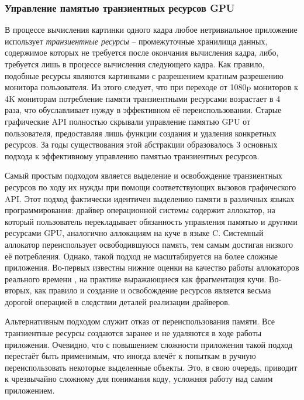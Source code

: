 \subsubsection{Управление памятью транзиентных ресурсов GPU}
В процессе вычисления картинки одного кадра любое нетривиальное приложение использует \textit{транзиентные ресурсы} -- промежуточные хранилища данных, содержимое которых не требуется после окончания вычисления кадра, либо, требуется лишь в процессе вычисления следующего кадра.
Как правило, подобные ресурсы являются картинками с разрешением кратным разрешению монитора пользователя.
Из этого следует, что при переходе от 1080p мониторов к 4K мониторам потребление памяти транзиентными ресурсами возрастает в 4 раза, что обуславливает нужду в эффективном её переиспользовании.
Старые графические API полностью скрывали управление памятью GPU от пользователя, предоставляя лишь функции создания и удаления конкретных ресурсов.
За годы существования этой абстракции образовалось 3 основных подхода к эффективному управлению памятью транзиентных ресурсов.

Самый простым подходом является выделение и освобождение транзиентных ресурсов по ходу их нужды при помощи соответствующих вызовов графического API.
Этот подход фактически идентичен выделению памяти в различных языках программирования: драйвер операционной системы содержит аллокатор, на который пользователь перекладывает обязанность управления памятью и другими ресурсами GPU, аналогично аллокациям на куче в языке C.
Системный аллокатор переиспользует освободившуюся память, тем самым достигая низкого её потребления.
Однако, такой подход не масштабируется на более сложные приложения. Во-первых известны нижние оценки на качество работы аллокаторов реального времени , на практике выражающиеся как фрагментация кучи.
Во-вторых, как правило и создание и освобождение ресурсов является весьма дорогой операцией в следствии деталей реализации драйверов.

Альтернативным подходом служит отказ от переиспользования памяти. Все транзиентные ресурсы создаются заранее и не удаляются в ходе работы приложения. Очевидно, что с повышением сложности приложения такой подход перестаёт быть применимым, что иногда влечёт к попыткам в ручную переиспользовать некоторые выделенные объекты. Это, в свою очередь, приводит к чрезвычайно сложному для понимания коду, усложняя работу над самим приложением.

